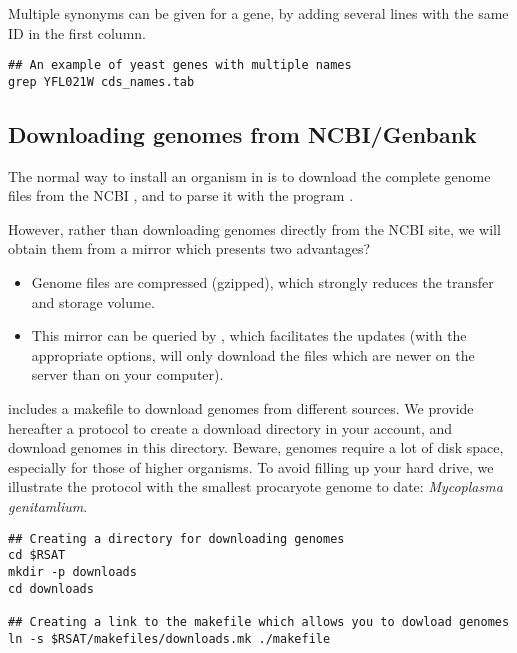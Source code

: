 Multiple synonyms can be given for a gene, by adding several lines with
the same ID in the first column.

\begin{footnotesize}
\begin{verbatim}
## An example of yeast genes with multiple names
grep YFL021W cds_names.tab 
\end{verbatim}
\end{footnotesize}



\subsection{Downloading genomes from NCBI/Genbank}

The normal way to install an organism in \RSAT is to download the
complete genome files from the NCBI
, and to parse it with the
program .

However, rather than downloading genomes directly from the NCBI site,
we will obtain them from a mirror
 which presents two
advantages?

\begin{itemize}
\item Genome files are compressed (gzipped), which strongly reduces
  the transfer and storage volume. 
\item This mirror can be queried by , which facilitates
  the updates (with the appropriate options,  will only
  download the files which are newer on the server than on your
  computer).
\end{itemize}

\RSAT includes a makefile to download genomes from different sources.
We provide hereafter a protocol to create a download directory in your
account, and download genomes in this directory. Beware, genomes
require a lot of disk space, especially for those of higher
organisms. To avoid filling up your hard drive, we illustrate the protocol
with the smallest procaryote genome to date: \textit{Mycoplasma
  genitamlium}.

\begin{footnotesize}
\begin{verbatim}
## Creating a directory for downloading genomes
cd $RSAT
mkdir -p downloads
cd downloads

## Creating a link to the makefile which allows you to dowload genomes
ln -s $RSAT/makefiles/downloads.mk ./makefile
\end{verbatim}
\end{footnotesize}

